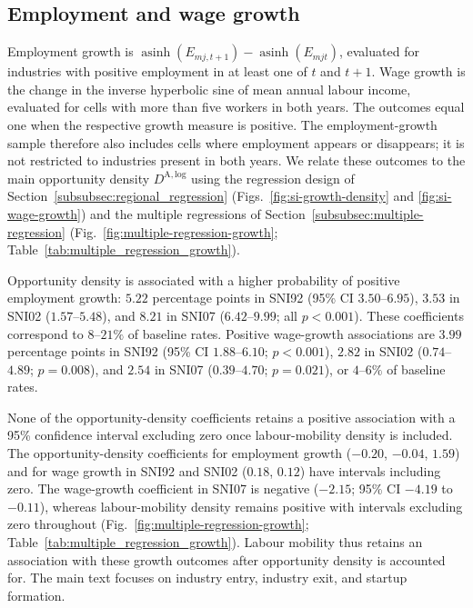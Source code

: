 \documentclass[9pt,twoside]{pnas-new}
\begin{document}
\subsection{Employment and wage growth}
\label{subsec:growth}

Employment growth is $\operatorname{asinh}(E_{mj,t+1})-\operatorname{asinh}(E_{mjt})$, evaluated for industries with positive employment in at least one of $t$ and $t+1$. Wage growth is the change in the inverse hyperbolic sine of mean annual labour income, evaluated for cells with more than five workers in both years. The outcomes equal one when the respective growth measure is positive. The employment-growth sample therefore also includes cells where employment appears or disappears; it is not restricted to industries present in both years. We relate these outcomes to the main opportunity density $D^{\mathrm{A,log}}$ using the regression design of Section~\ref{subsubsec:regional_regression} (Figs.~\ref{fig:si-growth-density} and \ref{fig:si-wage-growth}) and the multiple regressions of Section~\ref{subsubsec:multiple-regression} (Fig.~\ref{fig:multiple-regression-growth}; Table~\ref{tab:multiple_regression_growth}).

Opportunity density is associated with a higher probability of positive employment growth: $5.22$ percentage points in SNI92 (95\% CI $3.50$--$6.95$), $3.53$ in SNI02 ($1.57$--$5.48$), and $8.21$ in SNI07 ($6.42$--$9.99$; all $p<0.001$). These coefficients correspond to $8$--$21\%$ of baseline rates. Positive wage-growth associations are $3.99$ percentage points in SNI92 (95\% CI $1.88$--$6.10$; $p<0.001$), $2.82$ in SNI02 ($0.74$--$4.89$; $p=0.008$), and $2.54$ in SNI07 ($0.39$--$4.70$; $p=0.021$), or $4$--$6\%$ of baseline rates.

None of the opportunity-density coefficients retains a positive association with a 95\% confidence interval excluding zero once labour-mobility density is included. The opportunity-density coefficients for employment growth ($-0.20$, $-0.04$, $1.59$) and for wage growth in SNI92 and SNI02 ($0.18$, $0.12$) have intervals including zero. The wage-growth coefficient in SNI07 is negative ($-2.15$; 95\% CI $-4.19$ to $-0.11$), whereas labour-mobility density remains positive with intervals excluding zero throughout (Fig.~\ref{fig:multiple-regression-growth}; Table~\ref{tab:multiple_regression_growth}). Labour mobility thus retains an association with these growth outcomes after opportunity density is accounted for. The main text focuses on industry entry, industry exit, and startup formation.
\end{document}
